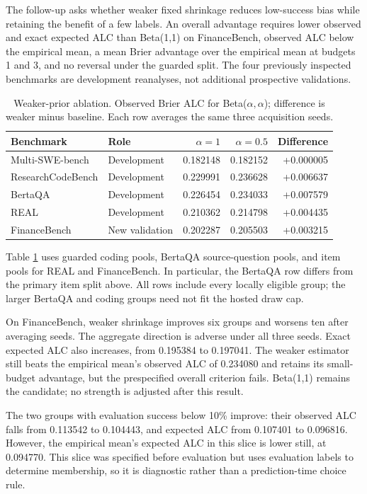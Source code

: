 \documentclass{article}
\begin{document}
The follow-up asks whether weaker fixed shrinkage reduces low-success bias while retaining the benefit of a few labels. An overall advantage requires lower observed and exact expected ALC than Beta(1,1) on FinanceBench, observed ALC below the empirical mean, a mean Brier advantage over the empirical mean at budgets 1 and 3, and no reversal under the guarded split. The four previously inspected benchmarks are development reanalyses, not additional prospective validations.

\begin{table}[ht]
\centering
\caption{Weaker-prior ablation. Observed Brier ALC for Beta($\alpha,\alpha$); difference is weaker minus baseline. Each row averages the same three acquisition seeds.}
\label{tab:weaker}
\small
\begin{tabular}{llrrr}
\toprule
Benchmark & Role & $\alpha=1$ & $\alpha=0.5$ & Difference \\
\midrule
Multi-SWE-bench & Development & 0.182148 & 0.182152 & +0.000005 \\
ResearchCodeBench & Development & 0.229991 & 0.236628 & +0.006637 \\
BertaQA & Development & 0.226454 & 0.234033 & +0.007579 \\
REAL & Development & 0.210362 & 0.214798 & +0.004435 \\
FinanceBench & New validation & 0.202287 & 0.205503 & +0.003215 \\
\bottomrule
\end{tabular}
\end{table}

Table \ref{tab:weaker} uses guarded coding pools, BertaQA source-question pools, and item pools for REAL and FinanceBench. In particular, the BertaQA row differs from the primary item split above. All rows include every locally eligible group; the larger BertaQA and coding groups need not fit the hosted draw cap.

On FinanceBench, weaker shrinkage improves six groups and worsens ten after averaging seeds. The aggregate direction is adverse under all three seeds. Exact expected ALC also increases, from 0.195384 to 0.197041. The weaker estimator still beats the empirical mean's observed ALC of 0.234080 and retains its small-budget advantage, but the prespecified overall criterion fails. Beta(1,1) remains the candidate; no strength is adjusted after this result.

The two groups with evaluation success below 10\% improve: their observed ALC falls from 0.113542 to 0.104443, and expected ALC from 0.107401 to 0.096816. However, the empirical mean's expected ALC in this slice is lower still, at 0.094770. This slice was specified before evaluation but uses evaluation labels to determine membership, so it is diagnostic rather than a prediction-time choice rule.
\end{document}
